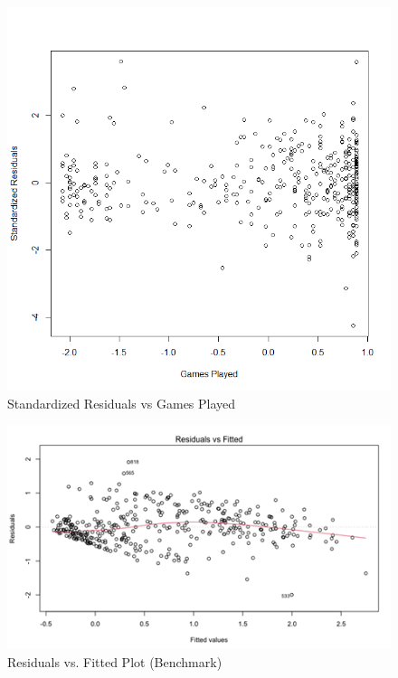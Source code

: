 \documentclass[10pt]{article}
\begin{document}
{{{{\begin{figure}[tph]
\centering
	\includegraphics[width=0.9\columnwidth]{games_played_vs_resid_sq}
	\caption[]
    	{Standardized Residuals vs Games Played\endtabular}
	\label{advanced-games}
\end{figure}

\begin{figure}[tph]
\centering
	\includegraphics[width=0.9\columnwidth]{benchmark_residuals_vs_fitted}
	\caption[]
    	{Residuals vs. Fitted Plot (Benchmark)\endtabular}
	\label{benchmark-residuals}
\end{figure}

}}}}
\end{document}
